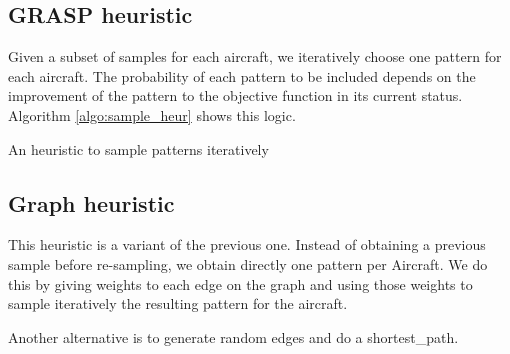 \documentclass[a4paper,11pt]{article}
\begin{document}
  \subsection{GRASP heuristic}
    \label{grasp}

    Given a subset of samples for each aircraft, we iteratively choose one pattern for each aircraft. The probability of each pattern to be included depends on the improvement of the pattern to the objective function in its current status. Algorithm \ref{algo:sample_heur} shows this logic.

    \begin{algorithm}
    \DontPrintSemicolon
    \BlankLine
    \caption{An heuristic to sample patterns iteratively}\label{algo:sample_heur}
    \end{algorithm}

  \subsection{Graph heuristic}
    \label{graphHeur}

    This heuristic is a variant of the previous one. Instead of obtaining a previous sample before re-sampling, we obtain directly one pattern per Aircraft. We do this by giving weights to each edge on the graph and using those weights to sample iteratively the resulting pattern for the aircraft.

    Another alternative is to generate random edges and do a shortest\_path.
\end{document}
